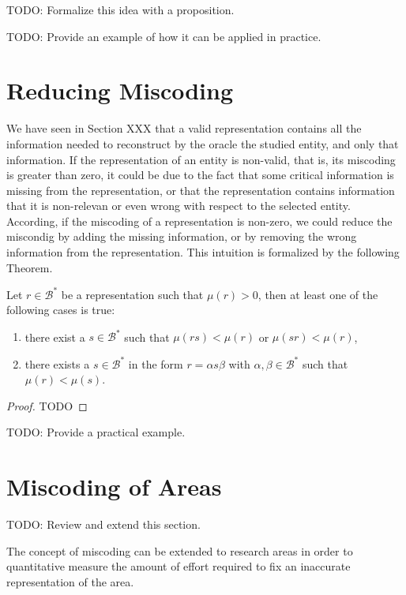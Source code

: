 {\color{red} TODO: Formalize this idea with a proposition.}

{\color{red} TODO: Provide an example of how it can be applied in practice.}


%
%
\section{Reducing Miscoding}

We have seen in Section {\color{red} XXX} that a valid representation contains all the information needed to reconstruct by the oracle the studied entity, and only that information. If the representation of an entity is non-valid, that is, its miscoding is greater than zero, it could be due to the fact that some critical information is missing from the representation, or that the representation contains information that it is non-relevan or even wrong with respect to the selected entity. According, if the miscoding of a representation is non-zero, we could reduce the miscondig by adding the missing information, or by removing the wrong information from the representation. This intuition is formalized by the following Theorem.

\begin{theorem}
Let $r \in \mathcal{B}^\ast$ be a representation such that $\mu(r) >0$, then at least one of the following cases is true:
\begin{enumerate}[label=(\roman*)]
\item there exist a $s \in \mathcal{B}^\ast$ such that $\mu(rs) < \mu(r)$ or $\mu(sr) < \mu(r)$,
\item there exists a $s \in \mathcal{B}^\ast$ in the form $r = \alpha s \beta$ with $\alpha, \beta \in \mathcal{B}^\ast$ such that $\mu(r) < \mu(s)$.
\end{enumerate}
\end{theorem}
\begin{proof}
{\color{red} TODO}
\end{proof}

{\color{red} TODO: Provide a practical example.}

%
%
\section{Miscoding of Areas}

{\color{red} TODO: Review and extend this section.}

The concept of miscoding can be extended to research areas in order to quantitative measure the amount of effort required to fix an inaccurate representation of the area.


